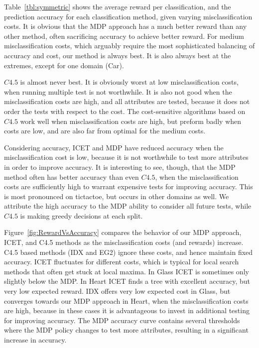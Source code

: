 \documentclass[letterpaper]{article}
\theoremstyle{definition}
\begin{document}
Table~\ref{tbl:symmetric} shows the average reward per classification, and the prediction accuracy for each classification method, given varying misclassification costs. It is obvious that the MDP approach has a much better reward than any other method, often sacrificing accuracy to achieve better reward. For medium misclassification costs, which arguably require the most sophisticated balancing of accuracy and cost, our method is always best. It is also always best at the extremes, except for one domain (Car).

$C4.5$ is almost never best. It is obviously worst at low misclassification costs, when running multiple test is not worthwhile. It is also not good when the misclassification costs are high, and all attributes are tested, because it does not order the tests with respect to the cost.
The cost-sensitive algorithms based on $C4.5$ work well when misclassification costs are high, but preform badly when costs are low, and are also far from optimal for the medium costs.

Considering accuracy, ICET and MDP have reduced accuracy when the misclassification cost is low, because it is not worthwhile to test more attributes in order to improve accuracy. It is interesting to see, though, that the MDP method often has better accuracy than even $C4.5$, when the misclassification costs are sufficiently high to warrant expensive tests for improving accuracy. This is most pronounced on tictactoe, but occurs in other domains as well. We attribute the high accuracy to the MDP ability to consider all future tests, while $C4.5$ is making greedy decisions at each split.

Figure~\ref{fig:RewardVsAccuracy} compares the behavior of our MDP approach, ICET, and C4.5 methods as the misclassification costs (and rewards) increase. C4.5 based methods (IDX and EG2) ignore these costs, and hence maintain fixed accuracy. ICET fluctuates for different costs, which is typical for local search methods that often get stuck at local maxima. In Glass ICET is sometimes only slightly below the MDP. In Heart ICET finds a tree with excellent accuracy, but very low expected reward. IDX offers very low expected cost in Glass, but converges towards our MDP approach in Heart, when the misclassification costs are high, because in these cases it is advantageous to invest in additional testing for improving accuracy. The MDP accuracy curve contains several thresholds where the MDP policy changes to test more attributes, resulting in a significant increase in accuracy.
\end{document}

